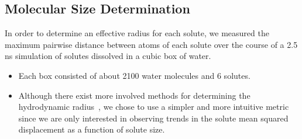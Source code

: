 \documentclass{article}
\begin{document}

  \subsection*{Molecular Size Determination}\label{method:molecular_size}
  
  In order to determine an effective radius for each solute, we measured the 
  maximum pairwise distance between atoms of each solute over the course of
  a 2.5 ns simulation of solutes dissolved in a cubic box of water.
  \begin{itemize}
    \item Each box consisted of about 2100 water molecules and 6 solutes.
    \item Although there exist more involved methods for determining the 
    hydrodynamic radius~\cite{schultz_determination_1961}, we chose to use
    a simpler and more intuitive metric since we are only interested in
    observing trends in the solute mean squared displacement as a function
    of solute size. 
  \end{itemize}
\end{document}
